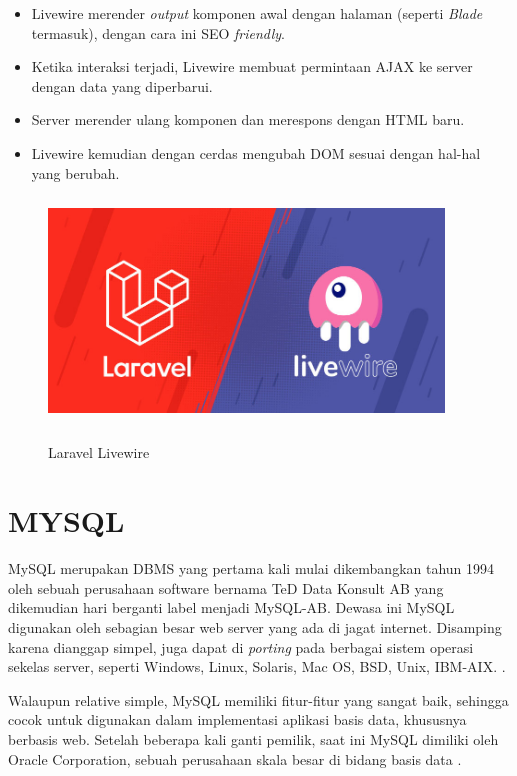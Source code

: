 \begin{itemize}
	\item Livewire merender \textit{output} komponen awal dengan halaman (seperti \textit{Blade} termasuk), dengan cara ini SEO \textit{friendly}.
	\item Ketika interaksi terjadi, Livewire membuat permintaan AJAX ke server dengan data yang diperbarui.
	\item Server merender ulang komponen dan merespons dengan HTML baru.
	\item Livewire kemudian dengan cerdas mengubah DOM sesuai dengan hal-hal yang berubah.
\end{itemize}

\begin{figure}[H]
\centering
{\includegraphics [width = 10.5cm, height= 6cm]{gambar/laravel-livewire}}
\caption{Laravel Livewire \citep{krishaweb2021}}
\label{laravel_livewire}
\end{figure}

\section{\uppercase{MySQL}}
MySQL merupakan DBMS yang pertama kali mulai dikembangkan tahun 1994 oleh sebuah perusahaan software bernama TeD Data Konsult AB yang dikemudian hari berganti label menjadi MySQL-AB. Dewasa ini MySQL digunakan oleh sebagian besar web server yang ada di jagat internet. Disamping karena dianggap simpel, juga dapat di \textit{porting} pada berbagai sistem operasi sekelas server, seperti Windows, Linux, Solaris, Mac OS, BSD, Unix, IBM-AIX. \citep{fathansyah2012}.

\par Walaupun relative simple, MySQL memiliki fitur-fitur yang sangat baik, sehingga cocok untuk digunakan dalam implementasi aplikasi basis data, khususnya berbasis web. Setelah beberapa kali ganti pemilik, saat ini MySQL dimiliki oleh Oracle Corporation, sebuah perusahaan skala besar di bidang basis data \citep{fathansyah2012}.

